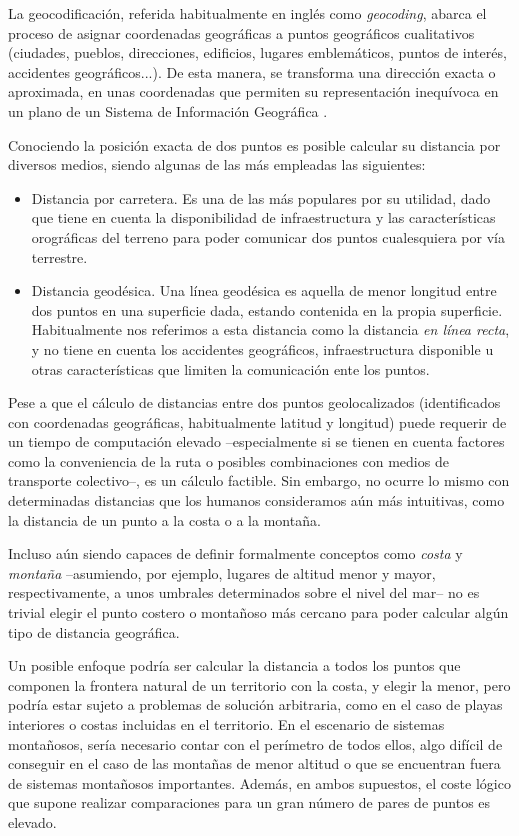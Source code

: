 La geocodificación, referida habitualmente en inglés como \textit{geocoding}, abarca el proceso de asignar coordenadas geográficas a puntos geográficos cualitativos (ciudades, pueblos, direcciones, edificios, lugares emblemáticos, puntos de interés, accidentes geográficos...). De esta manera, se transforma una dirección exacta o aproximada, en unas coordenadas que permiten su representación inequívoca en un plano de un Sistema de Información Geográfica \cite{geocodificacion}.

Conociendo la posición exacta de dos puntos es posible calcular su distancia por diversos medios, siendo algunas de las más empleadas las siguientes:

\begin{itemize}
    \item Distancia por carretera. Es una de las más populares por su utilidad, dado que tiene en cuenta la disponibilidad de infraestructura y las características orográficas del terreno para poder comunicar dos puntos cualesquiera por vía terrestre.
    \item Distancia geodésica. Una línea geodésica es aquella de menor longitud entre dos puntos en una superficie dada, estando contenida en la propia superficie. Habitualmente nos referimos a esta distancia como la distancia \textit{en línea recta}, y no tiene en cuenta los accidentes geográficos, infraestructura disponible u otras características que limiten la comunicación ente los puntos.
\end{itemize}

Pese a que el cálculo de distancias entre dos puntos geolocalizados (identificados con coordenadas geográficas, habitualmente latitud y longitud) puede requerir de un tiempo de computación elevado –especialmente si se tienen en cuenta factores como la conveniencia de la ruta o posibles combinaciones con medios de transporte colectivo–, es un cálculo factible. Sin embargo, no ocurre lo mismo con determinadas distancias que los humanos consideramos aún más intuitivas, como la distancia de un punto a la costa o a la montaña.

Incluso aún siendo capaces de definir formalmente conceptos como \textit{costa} y \textit{montaña} –asumiendo, por ejemplo, lugares de altitud menor y mayor, respectivamente, a unos umbrales determinados sobre el nivel del mar– no es trivial elegir el punto costero o montañoso más cercano para poder calcular algún tipo de distancia geográfica.

Un posible enfoque podría ser calcular la distancia a todos los puntos que componen la frontera natural de un territorio con la costa, y elegir la menor, pero podría estar sujeto a problemas de solución arbitraria, como en el caso de playas interiores o costas incluidas en el territorio. En el escenario de sistemas montañosos, sería necesario contar con el perímetro de todos ellos, algo difícil de conseguir en el caso de las montañas de menor altitud o que se encuentran fuera de sistemas montañosos importantes. Además, en ambos supuestos, el coste lógico que supone realizar comparaciones para un gran número de pares de puntos es elevado.

